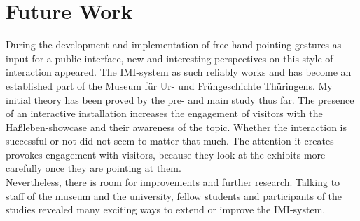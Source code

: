 \chapter{Future Work}
\label{future_work}

During the development and implementation of free-hand pointing gestures as input for a public interface, new and interesting perspectives on this style of interaction appeared. The \ac{IMI}-system as such reliably works and has become an established part of the Museum für Ur- und Frühgeschichte Thüringens. My initial theory has been proved by the pre- and main study thus far. The presence of an interactive installation increases the engagement of visitors with the Haßleben-showcase and their awareness of the topic. Whether the interaction is successful or not did not seem to matter that much. The attention it creates provokes engagement with visitors, because they look at the exhibits more carefully once they are pointing at them. 
\\
Nevertheless, there is room for improvements and further research. Talking to staff of the museum and the university, fellow students and participants of the studies revealed many exciting ways to extend or improve the \ac{IMI}-system. 

